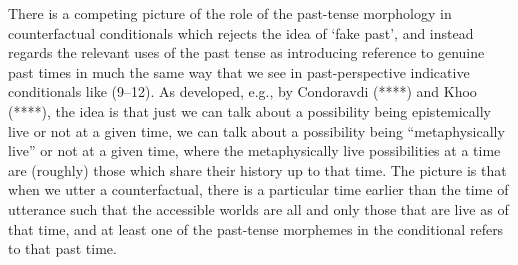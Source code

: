 There is a competing picture of the role of the past-tense morphology in
counterfactual conditionals which rejects the idea of `fake past', and
instead regards the relevant uses of the past tense as introducing
reference to genuine past times in much the same way that we see in
past-perspective indicative conditionals like (9--12). As developed,
e.g., by Condoravdi (****) and Khoo (****), the idea is that just we can
talk about a possibility being epistemically live or not at a given
time, we can talk about a possibility being ``metaphysically live'' or
not at a given time, where the metaphysically live possibilities at a
time are (roughly) those which share their history up to that time. The
picture is that when we utter a counterfactual, there is a particular
time earlier than the time of utterance such that the accessible worlds
are all and only those that are live as of that time, and at least one
of the past-tense morphemes in the conditional refers to that past time.

